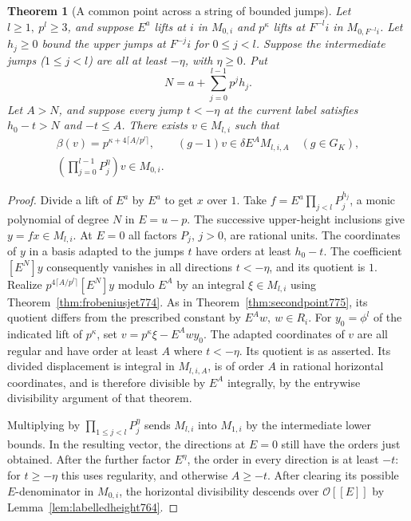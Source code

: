 \documentclass[a4paper,11pt]{article}
\newtheorem{theorem}[proposition]{Theorem}
\theoremstyle{definition}
\theoremstyle{remark}
\numberwithin{equation}{section}
\begin{document}
\begin{theorem}[A common point across a string of bounded jumps]
\leavevmode\label{thm:longpoint779}
Let \(l\ge1,\ p^l\ge3\), and suppose \(E^a\) lifts at
\(i\) in \(M_{0,i}\) and \(p^\kappa\) lifts at
\(F^{-l}i\) in \(M_{0,F^{-l}i}\). Let \(h_j\ge0\)
bound the upper jumps at \(F^{-j}i\) for \(0\le j<l\).
Suppose the intermediate jumps (\(1\le j<l\)) are all
at least \(-\eta\), with \(\eta\ge0\). Put
\[
                     N=a+\sum_{j=0}^{l-1}p^j h_j .
\]
Let \(A>N\), and suppose every jump \(t<-\eta\) at the
current label satisfies \(h_0-t>N\) and \(-t\le A\).
There exists \(v\in M_{l,i}\) such that
\[
 \begin{gathered}
   \beta(v)=p^{\kappa+4\lceil A/p^l\rceil},\qquad
   (g-1)v\in\delta E^A M_{l,i,A}\quad(g\in G_K),\\
                \left(\prod_{j=0}^{l-1}P_j^\eta\right)v
                          \in M_{0,i}.
 \end{gathered}
\]
\end{theorem}
\begin{proof}
Divide a lift of \(E^a\) by \(E^a\) to get \(x\) over \(1\).
Take \(f=E^a\prod_{j<l}P_j^{h_j}\), a monic polynomial
of degree \(N\) in \(E=u-p\).
The successive upper-height inclusions give \(y=fx\in M_{l,i}\).
At \(E=0\) all factors \(P_j\), \(j>0\), are rational
units. The coordinates of \(y\) in a basis adapted to
the jumps \(t\) have orders at least \(h_0-t\).
The coefficient \([E^N]y\) consequently vanishes in all
directions \(t<-\eta\), and its quotient is \(1\).
Realize \(p^{4\lceil A/p^l\rceil}[E^N]y\) modulo \(E^A\)
by an integral \(\xi\in M_{l,i}\) using
Theorem~\ref{thm:frobeniusjet774}. As in
Theorem~\ref{thm:secondpoint775}, its quotient differs
from the prescribed constant by \(E^A w,\ w\in R_i\).
For \(y_0=\phi^l\) of the indicated lift of \(p^\kappa\),
set \(v=p^\kappa\xi-E^A w y_0\). The adapted coordinates
of \(v\) are all regular and have order at least \(A\)
where \(t<-\eta\). Its quotient is as asserted. Its
divided displacement is integral in \(M_{l,i,A}\), is
of order \(A\) in rational horizontal coordinates, and
is therefore divisible by \(E^A\) integrally, by the
entrywise divisibility argument of that theorem.

Multiplying by \(\prod_{1\le j<l}P_j^\eta\) sends
\(M_{l,i}\) into \(M_{1,i}\) by the intermediate
lower bounds. In the resulting vector, the directions
at \(E=0\) still have the orders just obtained. After
the further factor \(E^\eta\), the order in every
direction is at least \(-t\): for \(t\ge-\eta\) this
uses regularity, and otherwise \(A\ge-t\).
After clearing its possible \(E\)-denominator in
\(M_{0,i}\), the horizontal divisibility descends over
\(\mathcal O[[E]]\) by Lemma~\ref{lem:labelledheight764}.
\end{proof}
\clearpage
\end{document}
